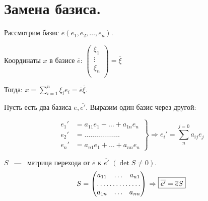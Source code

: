 


%
	
	
	\section{Замена базиса.}
	Рассмотрим базис $\overline{e}(e_1,e_2,\dots,e_n)$.
	
	Координаты $x$ в базисе $\overline{e}$: $ \begin{pmatrix}
	\xi_1\\  
	\vdots\\
	\xi_n\\
	\end{pmatrix} = \overline{\xi}$
	
	
	Тогда: $x  = \sum_{i=1}^n \xi_ie_i = \overline{e}\overline{\xi}$.
	\vspace{5mm}
	
	Пусть есть два базиса $\overline{e}, \overline{e'}$. Выразим один базис через другой:
	
	\begin{equation*}
	\left.
	\begin{aligned}
	e_1' &= a_{11}e_1 + \dots+ a_{1n}e_n\\
	e_2' &= \dots\dots\dots\dots\dots\dots\\
	e_n' &= a_{n1}e_1 + \dots  + a_{nn}e_n
	\end{aligned} 
	\right\} \Rightarrow e_i' = \sum^{j = 0}_n a_{ij}e_j \end{equation*}
	
	
	\vspace{3mm}
	
	$S$ ~---~ \textsf{матрица перехода} от $\overline{e}$ к $\overline{e'}$ $(\det S\neq 0).$
	\begin{equation*}
	\left.
	\begin{aligned}S = \begin{pmatrix}
	a_{11} & \dots & a_{n1}\\
	\hdotsfor{3}\\
	a_{1n} & \dots & a_{nn}\\
	\end{pmatrix}
	\end{aligned} 
	\right. \Rightarrow \boxed{\overline{e'} = \overline{e}S}
	\end{equation*}
	\vspace{3mm}
	
